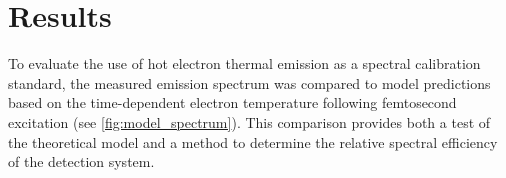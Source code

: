 \documentclass[
	parskip=half,
	a4paper,
]{scrarticle}
\begin{document}




\section{Results}

To evaluate the use of hot electron thermal emission as a spectral calibration standard, the measured emission spectrum was compared to model predictions based on the time-dependent electron temperature following femtosecond excitation (see \autoref{fig:model_spectrum}). This comparison provides both a test of the theoretical model and a method to determine the relative spectral efficiency of the detection system.
\end{document}
